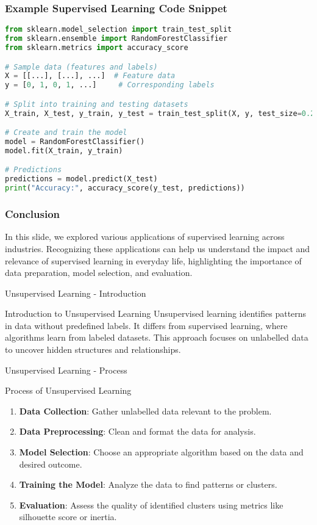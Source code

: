 \documentclass[aspectratio=169]{beamer}
\begin{document}
\begin{frame}[fragile]
    \frametitle{Example Supervised Learning Code Snippet}
    \begin{lstlisting}[language=Python]
from sklearn.model_selection import train_test_split
from sklearn.ensemble import RandomForestClassifier
from sklearn.metrics import accuracy_score

# Sample data (features and labels)
X = [[...], [...], ...]  # Feature data
y = [0, 1, 0, 1, ...]     # Corresponding labels

# Split into training and testing datasets
X_train, X_test, y_train, y_test = train_test_split(X, y, test_size=0.2, random_state=42)

# Create and train the model
model = RandomForestClassifier()
model.fit(X_train, y_train)

# Predictions
predictions = model.predict(X_test)
print("Accuracy:", accuracy_score(y_test, predictions))
    \end{lstlisting}
\end{frame}

\begin{frame}
    \frametitle{Conclusion}
    In this slide, we explored various applications of supervised learning across industries. Recognizing these applications can help us understand the impact and relevance of supervised learning in everyday life, highlighting the importance of data preparation, model selection, and evaluation.
\end{frame}

\begin{frame}[fragile]{Unsupervised Learning - Introduction}
  \begin{block}{Introduction to Unsupervised Learning}
    Unsupervised learning identifies patterns in data without predefined labels. It differs from supervised learning, where algorithms learn from labeled datasets. This approach focuses on unlabelled data to uncover hidden structures and relationships.
  \end{block}
\end{frame}

\begin{frame}[fragile]{Unsupervised Learning - Process}
  \begin{block}{Process of Unsupervised Learning}
    \begin{enumerate}
      \item \textbf{Data Collection}: Gather unlabelled data relevant to the problem.
      \item \textbf{Data Preprocessing}: Clean and format the data for analysis.
      \item \textbf{Model Selection}: Choose an appropriate algorithm based on the data and desired outcome.
      \item \textbf{Training the Model}: Analyze the data to find patterns or clusters.
      \item \textbf{Evaluation}: Assess the quality of identified clusters using metrics like silhouette score or inertia.
    \end{enumerate}
  \end{block}
\end{frame}
\end{document}
